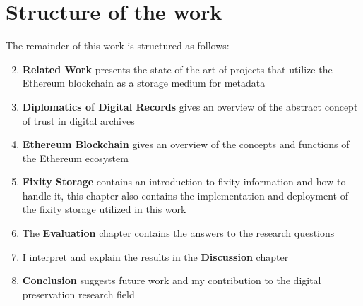 \section{Structure of the work}
The remainder of this work is structured as follows:
\begin{enumerate}[label=\textbf{\arabic*})]
  \setcounter{enumi}{1}
  \item \textbf{Related Work} presents the state of the art of projects that utilize the Ethereum blockchain as a storage medium for metadata
  \item \textbf{Diplomatics of Digital Records} gives an overview of the abstract concept of trust in digital archives
  \item \textbf{Ethereum Blockchain} gives an overview of the concepts and functions of the Ethereum ecosystem
  \item \textbf{Fixity Storage} contains an introduction to fixity information and how to handle it, this chapter also contains the implementation and deployment of the fixity storage utilized in this work
  \item The \textbf{Evaluation} chapter contains the answers to the research questions 
  \item I interpret and explain the results in the \textbf{Discussion} chapter
  \item \textbf{Conclusion} suggests future work and my contribution to the digital preservation research field
\end{enumerate}